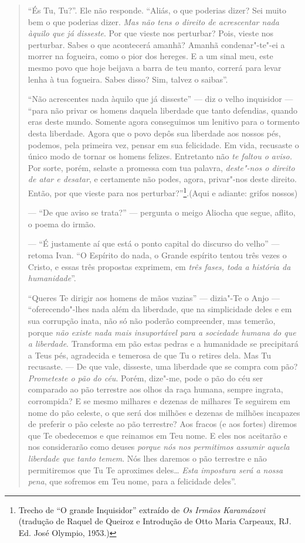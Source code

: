 \begin{quote}
``És Tu, Tu?''. Ele não responde. ``Aliás, o que poderias dizer? Sei
muito bem o que poderias dizer. \emph{Mas não tens o direito de
acrescentar nada àquilo que já disseste}. Por que vieste nos perturbar?
Pois, vieste nos perturbar. Sabes o que acontecerá amanhã? Amanhã
condenar"-te"-ei a morrer na fogueira, como o pior dos hereges. E a um
sinal meu, este mesmo povo que hoje beijava a barra de teu manto,
correrá para levar lenha à tua fogueira. Sabes disso? Sim, talvez o
saibas''.

``Não acrescentes nada àquilo que já disseste'' --- diz o velho
inquisidor --- ``para não privar os homens daquela liberdade que tanto
defendias, quando eras deste mundo. Somente agora conseguimos um
lenitivo para o tormento desta liberdade. Agora que o povo depôs sua
liberdade aos nossos pés, podemos, pela primeira vez, pensar em sua
felicidade. Em vida, recusaste o único modo de tornar os homens felizes.
Entretanto não \emph{te faltou o aviso.} Por sorte, porém, selaste a
promessa com tua palavra, \emph{deste"-nos o direito de atar e
desatar}, e certamente não podes, agora, privar"-nos deste direito.
Então, por que vieste para nos perturbar?''\footnote{Trecho de ``O
  grande Inquisidor'' extraído de \emph{Os Irmãos Karamázovi} (tradução
  de Raquel de Queiroz e Introdução de Otto Maria Carpeaux, RJ. Ed.
  José Olympio, 1953.)}.(Aqui e adiante: grifos nossos)

--- ``De que aviso se trata?'' --- pergunta o meigo Aliocha que segue, aflito,
o poema do irmão.

--- ``É justamente aí que está o ponto capital do discurso do velho'' ---
retoma Ivan. ``O Espírito do nada, o Grande espírito tentou três vezes o
Cristo, e essas três propostas exprimem, em \emph{três fases, toda a
história da humanidade}''.

``Queres Te dirigir aos homens de mãos vazias'' --- dizia"-Te o Anjo ---
``oferecendo"-lhes nada além da liberdade, que na simplicidade deles e em
sua corrupção inata, não só não poderão compreender, mas temerão, porque
\emph{não existe nada mais insuportável para a sociedade humana do que
a liberdade}. Transforma em pão estas pedras e a humanidade se
precipitará a Teus pés, agradecida e temerosa de que Tu o retires dela.
Mas Tu recusaste. --- De que vale, disseste, uma liberdade que se compra
com pão? \emph{Prometeste o pão do céu}. Porém, dize"-me, pode o pão do
céu ser comparado ao pão terrestre aos olhos da raça humana, sempre
ingrata, corrompida? E se mesmo milhares e dezenas de milhares Te
seguirem em nome do pão celeste, o que será dos milhões e dezenas de
milhões incapazes de preferir o pão celeste ao pão terrestre? Aos fracos
(e aos fortes) diremos que Te obedecemos e que reinamos em Teu nome. E
eles nos aceitarão e nos considerarão como deuses \emph{porque nós nos
permitimos assumir aquela liberdade que tanto temem}. Nós lhes daremos o
pão terrestre e não permitiremos que Tu Te aproximes deles\ldots{}
\emph{Esta impostura será a nossa pena}, que sofremos em Teu nome,
para a felicidade deles''.
\end{quote}

